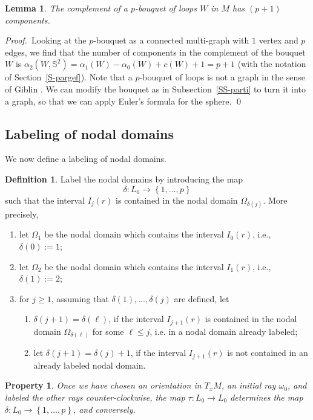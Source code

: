 \documentclass[12pt,a4paper]{amsart}
\theoremstyle{plain} %
\newtheorem{lemma}[theorem]{Lemma}
\newtheorem{property}[theorem]{Property}
\theoremstyle{definition}
\newtheorem{definition}[theorem]{Definition}
\numberwithin{equation}{section}
\numberwithin{figure}{section}
\numberwithin{table}{section}
\newcommand{\bS}{\mathbb{S}}
\newcommand{\pf}{\emph{Proof.~}}
\newcommand{\set}[1]{\left\lbrace #1 \right\rbrace}
\begin{document}
\begin{lemma}\label{L-llnd-2}
The complement of a $p$-bouquet of loops $W$ in $M$ has $(p+1)$ components.
\end{lemma}%

\pf Looking at the $p$-bouquet as a connected multi-graph with $1$ vertex and $p$ edges, we find that the number of components in the complement of the bouquet $W$ is $\alpha_2(W,\bS^2) = \alpha_1(W) - \alpha_0(W) + c(W) + 1 =p+1$ (with the notation of Section~\ref{S-pargef}).  Note that a $p$-bouquet of loops is not a graph in the sense of Giblin \cite{Gibl2010}. We can modify the bouquet as in Subsection~\ref{SS-parti} to turn it into a graph, so that we can apply Euler's formula for the sphere. \hfill \qed


\subsection{Labeling of nodal domains}\label{SS-llnd-d}

We now define a labeling of nodal domains.

\begin{definition}\label{D-llnd-2}
Label the nodal domains by introducing the map
%
$$
\delta : L_0 \to \set{1,\ldots,p}
$$
%
such that the interval $I_j(r)$ is contained in the nodal domain $\Omega_{\delta(j)}$. More precisely,
\begin{enumerate}
\item let $\Omega_1$ be the nodal domain which contains the interval $I_0(r)$, i.e., $\delta(0) := 1$;
\item let $\Omega_2$ be the nodal domain which contains  the interval $I_1(r)$, i.e., $\delta(1) := 2$;
\item for $j \ge 1$, assuming that $\delta(1), \ldots, \delta(j)$ are defined, let
\begin{enumerate}
\item[$\diamond$] $\delta(j+1) = \delta(\ell)$, if the interval $I_{j+1}(r)$ is contained in the nodal domain $\Omega_{\delta(\ell)}$ for some $\ell \le j$, i.e. in a nodal domain already labeled;
  \item[$\diamond$] let $\delta(j+1) = \delta(j) + 1$, if the interval $I_{j+1}(r)$ is not contained in an already labeled nodal domain.
\end{enumerate}
\end{enumerate}
\end{definition}%

\begin{property}\label{P-llnd-2}
Once we have chosen an orientation in $T_xM$, an initial ray $\omega_0$, and labeled the other rays counter-clockwise, the map $\tau : L_0 \to L_0$ determines the map $\delta : L_0 \to \set{1,\ldots,p}$, and conversely.
\end{property}%
\end{document}
